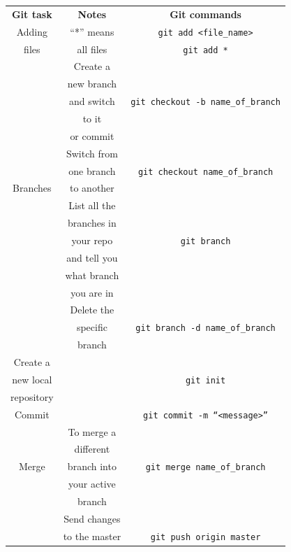 \documentclass[12pt,a4paper,titlepage,brazil]{article}
\begin{document}
{\begin{table}[h!]
 \begin{center}
  \begin{tabular}{c|c|c}
   \cline{1-3}
   \textbf{Git task} & \textbf{Notes} & \textbf{Git commands} \\
   \cline{1-3}
   Adding & ``*'' means & \texttt{git add <file\_name>}\\
   files & all files & \texttt{git add *}\\
   \cline{1-3} 
   & Create a & \\
   & new branch & \\
   & and switch & \texttt{git checkout -b name\_of\_branch}\\
   & to it & \\
   & or commit & \\
   \cline{2-3}
   & Switch from & \\
   & one branch & \texttt{git checkout name\_of\_branch}\\
   Branches & to another & \\    
   \cline{2-3}
   & List all the & \\
   & branches in & \\
   & your repo & \texttt{git branch} \\    
   & and tell you & \\
   & what branch & \\
   & you are in & \\
   \cline{2-3} 
   & Delete the & \\
   & specific & \texttt{git branch -d name\_of\_branch}\\
   & branch & \\    
   \cline{1-3}
   Create a & & \\
   new local & & \texttt{git init}\\
   repository & & \\
   \cline{1-3} 
   Commit & & \texttt{git commit -m ``<message>''}\\
   \cline{1-3} 
   & To merge a & \\
   & different & \\
   Merge & branch into & \texttt{git merge name\_of\_branch}\\
   & your active & \\
   & branch & \\
   \cline{1-3} 
   & Send changes & \\
   & to the master & \texttt{git push origin master}\\

\end{tabular}
\end{center}
\end{table}}
\end{document}
